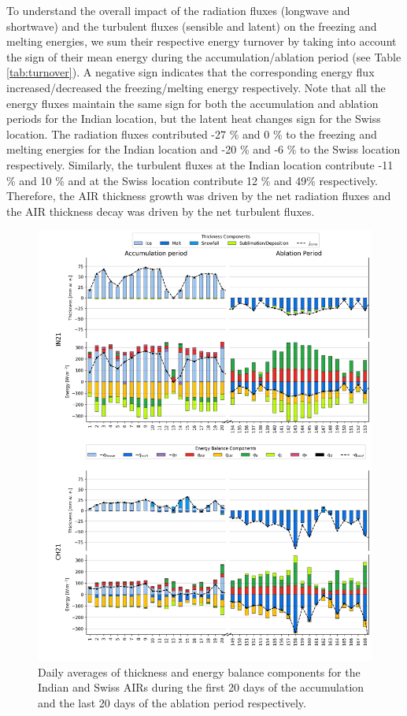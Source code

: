 \documentclass[utf8]{frontiersSCNS}
\begin{document}
To understand the overall impact of the radiation fluxes (longwave and shortwave) and the turbulent fluxes
(sensible and latent) on the freezing and melting energies, we sum their respective energy turnover by taking into
account the sign of their mean energy during the accumulation/ablation period (see Table \ref{tab:turnover}). A
negative sign indicates that the corresponding energy flux increased/decreased the freezing/melting energy
respectively. Note that all the energy fluxes maintain the same sign for both the accumulation and ablation
periods for the Indian location, but the latent heat changes sign for the Swiss location. The radiation fluxes
contributed -27 \% and 0 \% to the freezing and melting energies for the Indian location and -20 \% and -6 \%
to the Swiss location respectively.  Similarly, the turbulent fluxes at the Indian location contribute -11 \% and
10 \% and at the Swiss location contribute 12 \% and 49\%  respectively. Therefore, the AIR thickness growth was
driven by the net radiation fluxes and the AIR thickness decay was driven by the net turbulent fluxes.

\begin{figure}
	\begin{center}
		\includegraphics[width=\linewidth]{Figures/Figure_7.jpg} \end{center}
	\caption{Daily averages of thickness and energy balance components for the Indian and Swiss AIRs during the
		first 20 days of the accumulation and the last 20 days of the ablation period respectively.  } \label{fig:MEB}
\end{figure}
\end{document}
